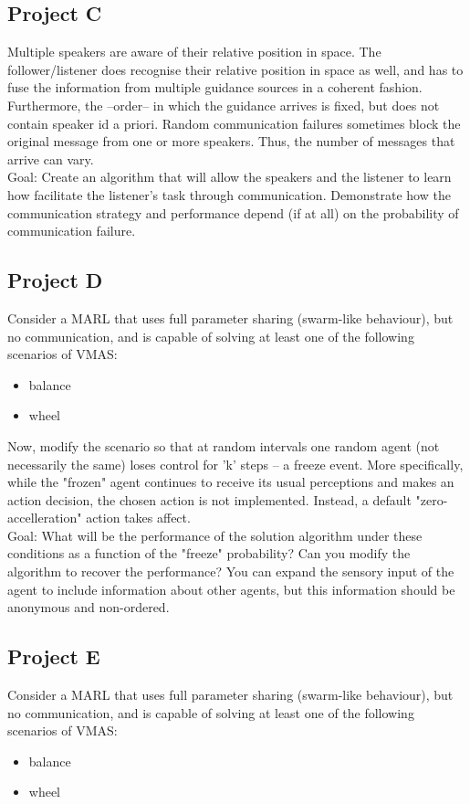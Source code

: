 \documentclass[a4paper,11pt]{article}
\begin{document}
\subsection*{Project C}
Multiple speakers are aware of their relative position in space. The follower/listener does recognise their relative position in space as well, and has to fuse the information from multiple guidance sources in a coherent fashion. Furthermore, the --order-- in which the guidance arrives is fixed, but does not contain speaker id a priori. Random communication failures sometimes block the original message from one or more speakers. Thus, the number of messages that arrive can vary. 
\\
Goal: Create an algorithm that will allow the speakers and the listener to learn how facilitate the listener's task through communication. Demonstrate how the communication strategy and performance depend (if at all) on the probability of communication failure. 

\subsection*{Project D}
Consider a MARL that uses full parameter sharing (swarm-like behaviour), but no communication, and is capable of solving at least one of the following scenarios of VMAS:
\begin{itemize}
    \item balance
    \item wheel
\end{itemize}

Now, modify the scenario so that at random intervals one random agent (not necessarily the same) loses control for 'k' steps -- a freeze event. More specifically, while the "frozen" agent continues to receive its usual perceptions and makes an action decision, the chosen action is not implemented. Instead, a default "zero-accelleration" action takes affect.
\\
Goal: What will be the performance of the solution algorithm under these conditions as a function of the "freeze" probability? Can you modify the algorithm to recover the performance? You can expand the sensory input of the agent to include information about other agents, but this information should be anonymous and non-ordered. 

\subsection*{Project E}
Consider a MARL that uses full parameter sharing (swarm-like behaviour), but no communication, and is capable of solving at least one of the following scenarios of VMAS:
\begin{itemize}
    \item balance
    \item wheel
\end{itemize}
\end{document}
